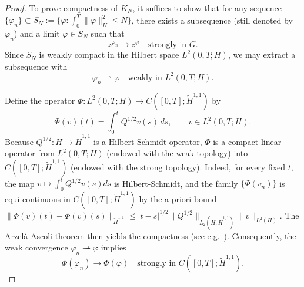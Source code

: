 \documentclass[11pt,a4paper,reqno]{amsart}
\theoremstyle{definition}
\begin{document}
\begin{proof}
  To prove compactness of $K_N$, it suffices to show that for any sequence
  $\{\varphi_n\}\subset S_N:=\{\varphi:\int_0^T\|\varphi\|_H^2\le N\}$, there exists a subsequence
  (still denoted by $\varphi_n$) and a limit $\varphi\in S_N$ such that
  \[
    z^{\varphi_n}\longrightarrow z^\varphi \quad\text{strongly in } G.
  \]
  Since $S_N$ is weakly compact in the Hilbert space $L^2(0,T;H)$,
  we may extract a subsequence with
  \[
    \varphi_n \rightharpoonup \varphi \quad\text{weakly in } L^2(0,T;H).
  \]

  \medskip
  Define the operator $\Phi: L^2(0,T;H) \to C([0,T];\widetilde H^{1,1})$ by
  \[
    \Phi(v)(t) = \int_0^t Q^{1/2}v(s)\,ds,\qquad v\in L^2(0,T;H).
  \]
  Because $Q^{1/2}:H\to\widetilde H^{1,1}$ is a Hilbert-Schmidt operator, $\Phi$ is a compact
  linear operator from $L^2(0,T;H)$ (endowed with the weak topology) into
  $C([0,T];\widetilde H^{1,1})$ (endowed with the strong topology).
  Indeed, for every fixed $t$, the map $v\mapsto \int_0^t Q^{1/2}v(s)ds$ is Hilbert-Schmidt,
  and the family $\{\Phi(v_n)\}$ is equi-continuous in $C([0,T];\widetilde H^{1,1})$ by
  the a priori bound $\|\Phi(v)(t)-\Phi(v)(s)\|_{\widetilde H^{1,1}} \le |t-s|^{1/2} \|Q^{1/2}\|_{L_2(H,\widetilde H^{1,1})} \|v\|_{L^2(H)}$.
  The Arzel\`{a}-Ascoli theorem then yields the compactness (see e.g.\ \cite{Wang2023}).
  Consequently, the weak convergence $\varphi_n\rightharpoonup\varphi$ implies
  \begin{equation}\label{eq:Phi_conv}
    \Phi(\varphi_n) \longrightarrow \Phi(\varphi) \quad\text{strongly in } C([0,T];\widetilde H^{1,1}).
  \end{equation}


\end{proof}
\end{document}
